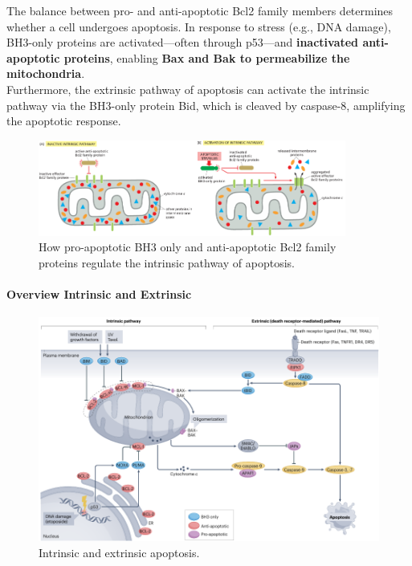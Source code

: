 \documentclass[../main.tex]{subfiles}
\begin{document}
\indent The balance between pro- and anti-apoptotic Bcl2 family members determines whether a cell undergoes apoptosis. In response to stress (e.g., DNA damage), BH3-only proteins are activated—often through p53—and \textbf{inactivated anti-apoptotic proteins}, enabling \textbf{Bax and Bak to permeabilize the mitochondria}.\\
\indent Furthermore, the extrinsic pathway of apoptosis can activate the intrinsic pathway via the BH3-only protein Bid, which is cleaved by caspase-8, amplifying the apoptotic response.

\begin{figure}[H]
	\centering
	\includegraphics[width = 0.9\textwidth]{11}
	\caption{How pro-apoptotic BH3 only and anti-apoptotic Bcl2 family proteins regulate the intrinsic pathway of apoptosis.}
\end{figure}


\paragraph{Overview Intrinsic and Extrinsic}

\begin{figure}[H]
	\centering
	\includegraphics[width = \textwidth]{5}
	\caption{Intrinsic and extrinsic apoptosis.}
\end{figure}
\end{document}
